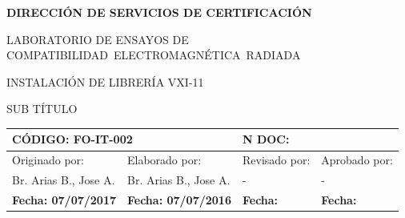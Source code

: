 \documentclass[paper=letter,oneside,fontsize=11pt, parskip=full]{scrartcl}
\begin{document}
			
		
		\begin{center}		
			
			\vspace{10cm}
			\begin{large}
				\bfseries
				\uppercase{Dirección de Servicios de Certificación}			
				\vspace{5pt}
				\begin{spacing}{0.9}
					\uppercase{Laboratorio de Ensayos de Compatibilidad~Electromagnética~Radiada}
				\end{spacing}
			\end{large}
			
			\vfill
			
			\begin{Large}
				\bfseries				
				\begin{spacing}{0.9}		
					\uppercase{Instalación de librería VXI-11}
				\end{spacing}
			\end{Large}	
				
			\vspace{5pt}
			
			\begin{large}						
				\uppercase{Sub Título}
			\end{large}	
			
			\vfill
			
			\begin{table}[!h]
				\begin{tabularx}{\linewidth}{|X|X|X|X|}	
					\hline				
					\multicolumn{2}{|l|}{\textbf{CÓDIGO}: FO-IT-002} & \multicolumn{2}{l|}{\textbf{N DOC:}} \\
					\hline
					Originado por:	& 	Elaborado por: & 
					Revisado por: 	& 	Aprobado por: \\
					\hline
					Br. Arias B., Jose A. & Br. Arias B., Jose A. & - & - \\
					\hline
					\textbf{Fecha: 07/07/2017 } & 
					\textbf{Fecha: 07/07/2016} & 
					\textbf{Fecha: } &
					\textbf{Fecha: } \\				
					\hline
				\end{tabularx}	
			\end{table}	
			
			\vfill
		
		\end{center}
	
\end{document}

